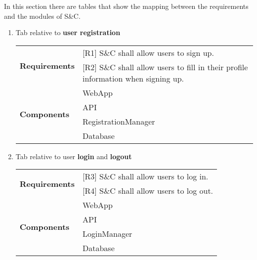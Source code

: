 In this section there are tables that show the mapping between the requirements and the modules of S\&C.

\begin{enumerate}   
    \item Tab relative to \textbf{user registration}
    \begin{center}
        \begin{tabular}{  |p{4cm}|p{10cm}| } 
        \hline
        \multirow{2}{6em}{\textbf{Requirements}} 
        & [R1] S\&C shall allow users to sign up. \\  
        & [R2] S\&C shall allow users to fill in their profile information when signing up. \\
        \hline
        \multirow{4}{6em}{\textbf{Components}} 
        & WebApp \\ 
        & API \\ 
        & RegistrationManager \\ 
        & Database \\
        \hline
        \end{tabular}
    \end{center}
    
    \item Tab relative to user \textbf{login} and \textbf{logout} 
    \begin{center}
        \begin{tabular}{ |p{4cm}|p{10cm}| } 
        \hline
        \multirow{2}{6em}{\textbf{Requirements}} 
        & [R3] S\&C shall allow users to log in. \\                 
        & [R4] S\&C shall allow users to log out. \\          
        \hline
        \multirow{4}{6em}{\textbf{Components}} 
        & WebApp \\ 
        & API \\ 
        & LoginManager \\ 
        & Database \\
        \hline
        \end{tabular}
    \end{center}
    
    
    

\end{enumerate}
